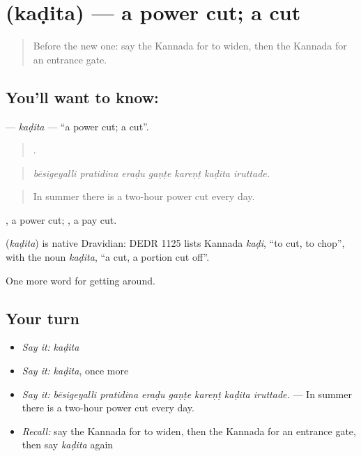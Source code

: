 \section[\texorpdfstring{\kn{ಕಡಿತ} (kaḍita)}{ಕಡಿತ (kaḍita)}]{ (kaḍita) — a power cut; a cut}

\label{lesson:KA-C470-kadita}



\begin{quote}
Before the new one: say the Kannada for to widen, then the Kannada for an entrance gate.
\end{quote}

\subsection*{You'll want to know: }
\textbf{} — \emph{kaḍita} — \textquotedblleft{}a power cut; a cut\textquotedblright{}.

\begin{quote}
      .
\end{quote}

\begin{quote}
\emph{bēsigeyalli pratidina eraḍu gaṇṭe kareṇṭ kaḍita iruttade.}
\end{quote}

\begin{quote}
In summer there is a two-hour power cut every day.
\end{quote}

 , a power cut;  , a pay cut.

\begin{cousinweb}
\textbf{} (\emph{kaḍita}) is native Dravidian: DEDR 1125 lists Kannada \emph{kaḍi}, \textquotedblleft{}to cut, to chop\textquotedblright{}, with the noun \emph{kaḍita}, \textquotedblleft{}a cut, a portion cut off\textquotedblright{}.
\end{cousinweb}

\begin{grammarlens}[title={What you've built}]
One more word for getting around.
\end{grammarlens}

\subsection*{Your turn}
\begin{itemize}
\raggedright
  \item \emph{Say it:} \emph{kaḍita}
  \item \emph{Say it:} \emph{kaḍita}, once more
  \item \emph{Say it:} \emph{bēsigeyalli pratidina eraḍu gaṇṭe kareṇṭ kaḍita iruttade.} — In summer there is a two-hour power cut every day.
  \item \emph{Recall:} say the Kannada for to widen, then the Kannada for an entrance gate, then say \emph{kaḍita} again
\end{itemize}

